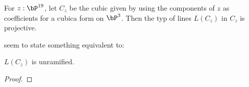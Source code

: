 
For $z:\bP^{19}$, let $C_z$ be the cubic given by using the components of $z$ as coefficients for a cubica form on $\bP^3$.
Then the typ of lines $L(C_z)$ in $C_z$ is projective.

\cite[Theorem 27.3.1]{vakil} seem to state something equivalent to:

\begin{lemma}
\label{line-on-cubic-deformation}
$L(C_z)$ is unramified.  
\end{lemma}

\begin{proof}
\end{proof}
